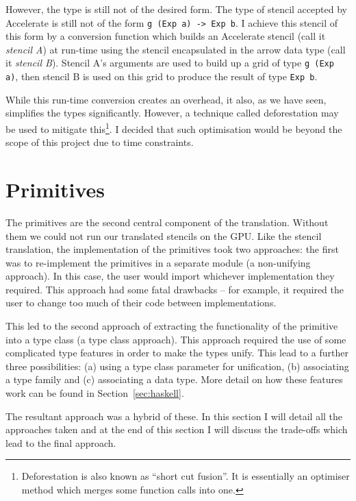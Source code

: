 \documentclass[12pt,a4paper,oneside]{scrbook}
\begin{document}
However, the type is still not of the desired form. The type of stencil accepted
by Accelerate is still not of the form \texttt{g (Exp a) -\textgreater{} Exp
  b}. I achieve this stencil of this form by a conversion function which builds
an Accelerate stencil (call it \emph{stencil A}) at run-time using the stencil
encapsulated in the arrow data type (call it \emph{stencil B}). Stencil A's
arguments are used to build up a grid of type \texttt{g (Exp a)}, then stencil B
is used on this grid to produce the result of type \texttt{Exp b}.

While this run-time conversion creates an overhead, it also, as we have
seen, simplifies the types significantly. However, a technique called
deforestation may be used to mitigate this\footnote{Deforestation is also known
  as ``short cut fusion''. It is essentially an optimiser method which merges
  some function calls into one.}. I decided that such optimisation would be
beyond the scope of this project due to time constraints.

\section{Primitives}
\label{sec:prims}

The primitives are the second central component of the translation.  Without
them we could not run our translated stencils on the GPU. Like the stencil
translation, the implementation of the primitives took two approaches: the first
was to re-implement the primitives in a separate module (a non-unifying
approach). In this case, the user would import whichever implementation they
required. This approach had some fatal drawbacks -- for example, it required the
user to change too much of their code between implementations.

This led to the second approach of extracting the functionality of the primitive
into a type class (a type class approach). This approach required the use of
some complicated type features in order to make the types unify. This lead to a
further three possibilities: (a) using a type class parameter for unification,
(b) associating a type family and (c) associating a data type. More detail on
how these features work can be found in Section~\ref{sec:haskell}.

The resultant approach was a hybrid of these. In this section I will detail all
the approaches taken and at the end of this section I will discuss the
trade-offs which lead to the final approach.
\end{document}
